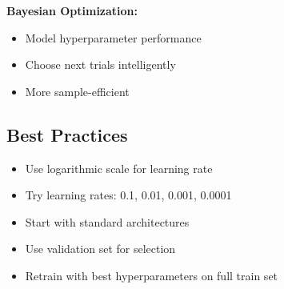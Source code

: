 \textbf{Bayesian Optimization:}
\begin{itemize}
    \item Model hyperparameter performance
    \item Choose next trials intelligently
    \item More sample-efficient
\end{itemize}

\subsection{Best Practices}

\begin{itemize}
    \item Use logarithmic scale for learning rate
    \item Try learning rates: 0.1, 0.01, 0.001, 0.0001
    \item Start with standard architectures
    \item Use validation set for selection
    \item Retrain with best hyperparameters on full train set
\end{itemize}


